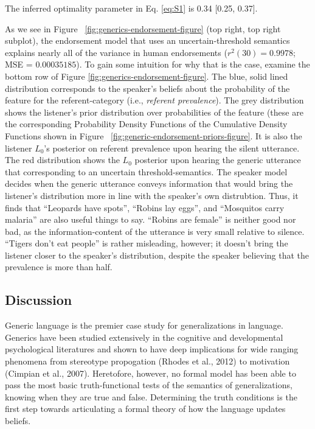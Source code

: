 \documentclass[english,floatsintext,man]{apa6}
\theoremstyle{definition}
\theoremstyle{definition}
\theoremstyle{definition}
\theoremstyle{remark}
\begin{document}
The inferred optimality parameter in Eq. \ref{eq:S1} is 0.34 {[}0.25,
0.37{]}.

As we see in Figure ~\ref{fig:generics-endorsement-figure} (top right,
top right subplot), the endorsement model that uses an
uncertain-threshold semantics explains nearly all of the variance in
human endorsements (\(r^2(30) = 0.9978\); MSE = \(0.00035185\)). To gain
some intuition for why that is the case, examine the bottom row of
Figure \ref{fig:generics-endorsement-figure}. The blue, solid lined
distribution corresponds to the speaker's beliefs about the probability
of the feature for the referent-category (i.e., \emph{referent
prevalence}). The grey distribution shows the listener's prior
distribution over probabilities of the feature (these are the
corresponding Probability Density Functions of the Cumulative Density
Functions shown in Figure ~\ref{fig:generic-endorsement-priors-figure}.
It is also the listener \(L_0\)'s posterior on referent prevalence upon
hearing the silent utterance. The red distribution shows the \(L_0\)
posterior upon hearing the generic utterance that corresponding to an
uncertain threshold-semantics. The speaker model decides when the
generic utterance conveys information that would bring the listener's
distribution more in line with the speaker's own distrubtion. Thus, it
finds that \enquote{Leopards have spots}, \enquote{Robins lay eggs}, and
\enquote{Mosquitos carry malaria} are also useful things to say.
\enquote{Robins are female} is neither good nor bad, as the
information-content of the utterance is very small relative to silence.
\enquote{Tigers don't eat people} is rather misleading, however; it
doesn't bring the listener closer to the speaker's distribution, despite
the speaker believing that the prevalence is more than half.

\subsection{Discussion}\label{discussion}

Generic language is the premier case study for generalizations in
language. Generics have been studied extensively in the cognitive and
developmental psychological literatures and shown to have deep
implications for wide ranging phenomena from stereotype propogation
(Rhodes et al., 2012) to motivation (Cimpian et al., 2007). Heretofore,
however, no formal model has been able to pass the most basic
truth-functional tests of the semantics of generalizations, knowing when
they are true and false. Determining the truth conditions is the first
step towards articulating a formal theory of how the language updates
beliefs.
\end{document}
